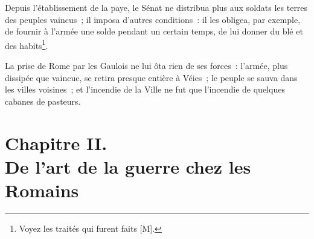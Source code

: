 \documentclass[french,twoside]{book} %
\newcommand\chapteropen{} %
\newcommand\chapterclose{} %
\begin{document}
Depuis l’établissement de la paye, le Sénat ne distribua plus aux soldats les terres des peuples vaincus ; il imposa d’autres conditions : il les obligea, par exemple, de fournir à l’armée une solde pendant un certain temps, de lui donner du blé et des habits\footnote{Voyez les traités qui furent faits [M].}.\par
La prise de Rome par les Gaulois ne lui ôta rien de ses forces : l’armée, plus dissipée que vaincue, se retira presque entière à Véies ; le peuple se sauva dans les villes voisines ; et l’incendie de la Ville ne fut que l’incendie de quelques cabanes de pasteurs.
\chapterclose


\chapteropen
\chapter[{Chapitre II. De l’art de la guerre chez les Romains}]{Chapitre II. \\
De l’art de la guerre chez les Romains}
\label{considérations\_Romains\_chap\_02}\renewcommand{\leftmark}{Chapitre II. \\
De l’art de la guerre chez les Romains}
\end{document}
